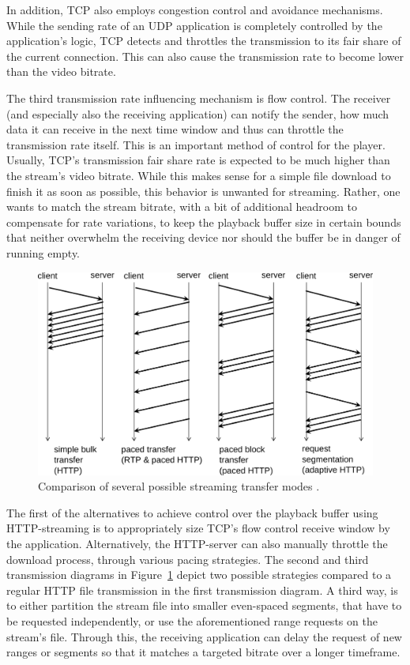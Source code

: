 In addition, \gls{TCP} also employs congestion control and avoidance mechanisms. While the sending rate of an \gls{UDP} application is completely controlled by the application's logic, \gls{TCP} detects and throttles the transmission to its fair share of the current connection. This can also cause the transmission rate to become lower than the video bitrate. 

The third transmission rate influencing mechanism is flow control. The receiver (and especially also the receiving application) can notify the sender, how much data it can receive in the next time window and thus can throttle the transmission rate itself. This is an important method of control for the player. Usually, \gls{TCP}'s transmission fair share rate is expected to be much higher than the stream's video bitrate. While this makes sense for a simple file download to finish it as soon as possible, this behavior is unwanted for streaming. Rather, one wants to match the stream bitrate, with a bit of additional headroom to compensate for rate variations, to keep the playback buffer size in certain bounds that neither overwhelm the receiving device nor should the buffer be in danger of running empty. 

\begin{figure}[htbp]
\centering
\includegraphics[width=1.0\textwidth]{images/streaming-transfer-modes.pdf}
\caption{Comparison of several possible streaming transfer modes \cite{ma2011mobile}.}
\label{c3:fig:streamingtransfermodes}
\end{figure}

The first of the alternatives to achieve control over the playback buffer using \gls{HTTP}-streaming is to appropriately size \gls{TCP}'s flow control receive window by the application. 
Alternatively, the \gls{HTTP}-server can also manually throttle the download process, through various pacing strategies. The second and third transmission diagrams in Figure~\ref{c3:fig:streamingtransfermodes} depict two possible strategies compared to a regular \gls{HTTP} file transmission in the first transmission diagram. A third way, is to either partition the stream file into smaller even-spaced segments, that have to be requested independently, or use the aforementioned range requests on the stream's file. Through this, the receiving application can delay the request of new ranges or segments so that it matches a targeted bitrate over a longer timeframe.

